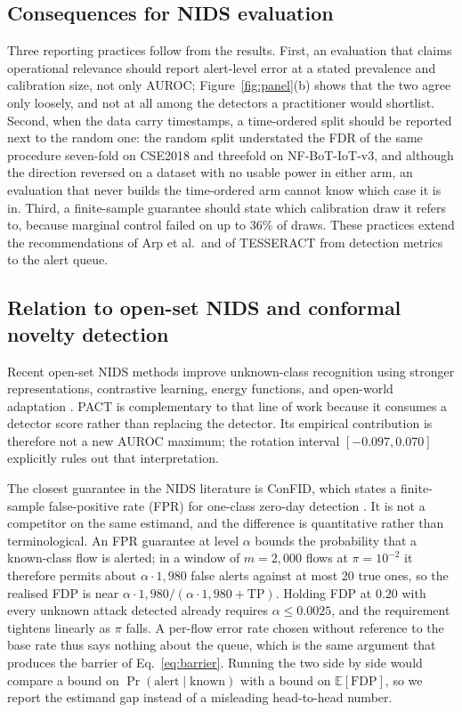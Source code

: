 \documentclass[a4paper,fleqn]{cas-dc}
\newcommand{\PACT}{PACT\xspace}
\newcommand{\FDP}{\mathrm{FDP}}
\begin{document}
\subsection{Consequences for NIDS evaluation}
Three reporting practices follow from the results. First, an evaluation that claims operational relevance should report alert-level error at a stated prevalence and calibration size, not only AUROC; Figure~\ref{fig:panel}(b) shows that the two agree only loosely, and not at all among the detectors a practitioner would shortlist. Second, when the data carry timestamps, a time-ordered split should be reported next to the random one: the random split understated the FDR of the same procedure seven-fold on CSE2018 and threefold on NF-BoT-IoT-v3, and although the direction reversed on a dataset with no usable power in either arm, an evaluation that never builds the time-ordered arm cannot know which case it is in. Third, a finite-sample guarantee should state which calibration draw it refers to, because marginal control failed on up to 36\% of draws. These practices extend the recommendations of Arp et al.\ and of TESSERACT \cite{arp2022dos,pendlebury2019tesseract} from detection metrics to the alert queue.

\subsection{Relation to open-set NIDS and conformal novelty detection}
Recent open-set NIDS methods improve unknown-class recognition using stronger representations, contrastive learning, energy functions, and open-world adaptation \cite{souza2025efc,wilkie2026closr,du2025ori,zhao2024foss,cevallos2025hero}. \PACT is complementary to that line of work because it consumes a detector score rather than replacing the detector. Its empirical contribution is therefore not a new AUROC maximum; the rotation interval $[-0.097,0.070]$ explicitly rules out that interpretation.

The closest guarantee in the NIDS literature is ConFID, which states a finite-sample false-positive rate (FPR) for one-class zero-day detection \cite{farsimadan2026confid}. It is not a competitor on the same estimand, and the difference is quantitative rather than terminological. An FPR guarantee at level $\alpha$ bounds the probability that a known-class flow is alerted; in a window of $m=2{,}000$ flows at $\pi=10^{-2}$ it therefore permits about $\alpha\cdot1{,}980$ false alerts against at most 20 true ones, so the realised FDP is near $\alpha\cdot1{,}980/(\alpha\cdot1{,}980+\mathrm{TP})$. Holding FDP at $0.20$ with every unknown attack detected already requires $\alpha\le0.0025$, and the requirement tightens linearly as $\pi$ falls. A per-flow error rate chosen without reference to the base rate thus says nothing about the queue, which is the same argument that produces the barrier of Eq.~\eqref{eq:barrier}. Running the two side by side would compare a bound on $\Pr(\text{alert}\mid\text{known})$ with a bound on $\mathbb{E}[\FDP]$, so we report the estimand gap instead of a misleading head-to-head number.
\end{document}
